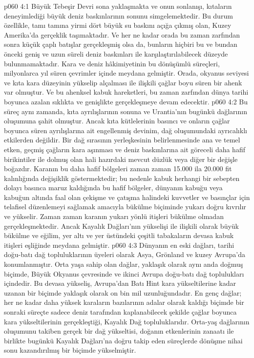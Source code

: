 \vs p060 4:1 Büyük Tebeşir Devri sona yaklaşmakta ve onun sonlanışı, kıtaların deneyimlediği büyük deniz baskınlarının sonunu simgelemektedir. Bu durum özellikle, tamı tamına yirmi dört büyük su baskını açığa çıkmış olan, Kuzey Amerika’da gerçeklik taşımaktadır. Ve her ne kadar orada bu zaman zarfından sonra küçük çaplı batışlar gerçekleşmiş olsa da, bunların hiçbiri bu ve bundan önceki geniş ve uzun süreli deniz baskınları ile karşılaştırılabilecek düzeyde bulunmamaktadır. Kara ve deniz hâkimiyetinin bu dönüşümlü süreçleri, milyonlarca yıl süren çevrimler içinde meydana gelmiştir. Orada, okyanus seviyesi ve kıta kara düzeyinin yükselip alçalması ile ilişkili çağlar boyu süren bir ahenk var olmuştur. Ve bu ahenksel kabuk hareketleri, bu zaman zarfından dünya tarihi boyunca azalan sıklıkta ve genişlikte gerçekleşmeye devam edecektir.
\vs p060 4:2 Bu süreç aynı zamanda, kıta ayrılışlarının sonuna ve Urantia’nın bugünkü dağlarının oluşumuna şahit olmuştur. Ancak kıta kütlelerinin basıncı ve onların çağlar boyunca süren ayrılışlarına ait engellenmiş devinim, dağ oluşumundaki ayrıcalıklı etkilerden değildir. Bir dağ sırasının yerleşkesinin belirlenmesinde ana ve temel etken, geçmiş çağların kara aşınması ve deniz baskınlarına ait göreceli daha hafif birikintiler ile dolmuş olan hali hazırdaki mevcut düzlük veya diğer bir değişle boğazdır. Karanın bu daha hafif bölgeleri zaman zaman 15.000 ila 20.000 fit kalınlığında değişiklik göstermektedir; bu nedenle kabuk herhangi bir sebepten dolayı basınca maruz kaldığında bu hafif bölgeler, dünyanın kabuğu veya kabuğun altında faal olan çekişme ve çatışma halindeki kuvvetler ve basınçlar için telafisel düzenlemeyi sağlamak amacıyla bükülme biçiminde yukarı doğru kıvrılır ve yükselir. Zaman zaman karanın yukarı yönlü itişleri bükülme olmadan gerçekleşmektedir. Ancak Kayalık Dağları’nın yükselişi ile ilişkili olarak büyük bükülme ve eğilim, yer altı ve yer üstündeki çeşitli tabakaların devasa kabuk itişleri eşliğinde meydana gelmiştir.
\vs p060 4:3 Dünyanın en eski dağları, tarihi doğu\hyp{}batı dağ topluluklarının üyeleri olarak Asya, Grönland ve kuzey Avrupa’da konumlanmıştır. Orta yaşa sahip olan dağlar, yaklaşık olarak aynı anda doğmuş biçimde, Büyük Okyanus çevresinde ve ikinci Avrupa doğu\hyp{}batı dağ toplulukları içindedir. Bu devasa yükseliş, Avrupa’dan Batı Hint kara yükseltilerine kadar uzanan bir biçimde yaklaşık olarak on bin mil uzunluğundadır. En genç dağlar; her ne kadar daha yüksek karaların bazılarının adalar olarak kaldığı biçimde bir sonraki süreçte sadece deniz tarafından kaplanabilecek şekilde çağlar boyunca kara yükseltilerinin gerçekleştiği, Kayalık Dağ topluluklarıdır. Orta\hyp{}yaş dağlarının oluşumunu takiben gerçek bir dağ yükseltisi, doğanın etkenlerinin zanaatı ile birlikte bugünkü Kayalık Dağları’na doğru takip eden süreçlerde dönüşme nihai sonu kazandırılmış bir biçimde yükselmiştir.
